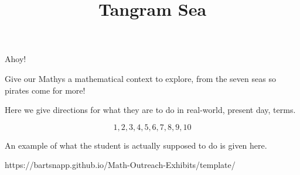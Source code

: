 \documentclass{../exhibit}
\title{Tangram Sea}
\begin{document}
\begin{context}
  Ahoy!

  Give our Mathys a mathematical context to explore, from the seven
  seas  so pirates come for more!
\end{context}



\begin{directions}
  Here we give directions for what they are to do in real-world,
  present day, terms.

  \[
  1,2,3,4,5,6,7,8,9,10
  \]
  \scalebox{3}{$\pi$}
\end{directions}



\begin{example}
  An example of what the student is actually supposed to do is given
  here.
\end{example}



\begin{mathConnections}
  https://bartsnapp.github.io/Math-Outreach-Exhibits/template/
\end{mathConnections}
\end{document}
